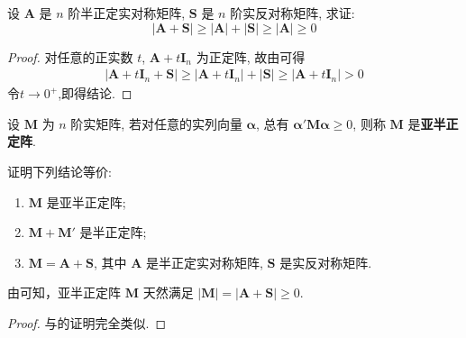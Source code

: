\documentclass[../../main.tex]{subfiles}%
\begin{document}
\begin{proposition}\label{proposition:半正定阵的行列式的相关的不等式}
设 \(\boldsymbol{A}\) 是 \(n\) 阶半正定实对称矩阵, \(\boldsymbol{S}\) 是 \(n\) 阶实反对称矩阵, 求证:
\[|\boldsymbol{A}+\boldsymbol{S}|\geqslant |\boldsymbol{A}|+|\boldsymbol{S}|\geqslant |\boldsymbol{A}|\geqslant 0\]
\end{proposition}
\begin{proof}

对任意的正实数 \(t\), \(\boldsymbol{A}+t\boldsymbol{I}_n\) 为正定阵, 故由可得
\begin{align*}
|\boldsymbol{A}+t\boldsymbol{I}_n+\boldsymbol{S}|\geqslant |\boldsymbol{A}+t\boldsymbol{I}_n|+|\boldsymbol{S}|\geqslant |\boldsymbol{A}+t\boldsymbol{I}_n|>0
\end{align*}
令\(t\to0^+\),即得结论.

\end{proof}

\begin{definition}[亚半正定]
设 \(\boldsymbol{M}\) 为 \(n\) 阶实矩阵, 若对任意的实列向量 \(\boldsymbol{\alpha}\), 总有 \(\boldsymbol{\alpha}'\boldsymbol{M}\boldsymbol{\alpha}\geqslant 0\), 则称 \(\boldsymbol{M}\) 是\textbf{亚半正定阵}. 
\end{definition}

\begin{theorem}\label{theorem:亚半正定阵的等价条件}
证明下列结论等价:
\begin{enumerate}[(1)]
\item \(\boldsymbol{M}\) 是亚半正定阵;
\item \(\boldsymbol{M}+\boldsymbol{M}'\) 是半正定阵;
\item \(\boldsymbol{M}=\boldsymbol{A}+\boldsymbol{S}\), 其中 \(\boldsymbol{A}\) 是半正定实对称矩阵, \(\boldsymbol{S}\) 是实反对称矩阵.
\end{enumerate} 
\end{theorem}
\begin{remark}
由可知，亚半正定阵 \(\boldsymbol{M}\) 天然满足 \(|\boldsymbol{M}| = |\boldsymbol{A}+\boldsymbol{S}|\geqslant 0\).
\end{remark}
\begin{proof}

与的证明完全类似.

\end{proof}
\end{document}
